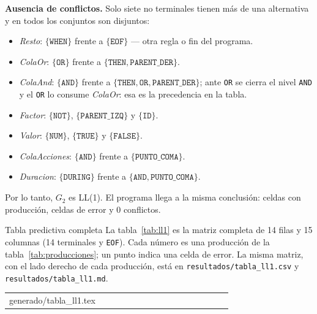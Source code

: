 \documentclass[11pt,letterpaper]{article}
\makeatletter
\renewcommand\subsection{\@startsection{subsection}{2}{\z@}{-2.6ex\@plus -1ex \@minus -.2ex}{1.0ex \@plus .2ex}%
  {\normalfont\large\bfseries}}
\newcommand{\captionof}[1]{\def\@captype{#1}\caption}
\newcommand{\filas}[1]{\@@input #1 }
\newcommand{\ruta}[1]{\nolinkurl{#1}}
\newcommand{\T}[1]{\texttt{#1}}
\newcommand{\NT}[1]{\textit{#1}}
\makeatother
\begin{document}
\textbf{Ausencia de conflictos.} Solo siete no terminales tienen más de una alternativa y en todos los conjuntos
son disjuntos:
\begin{itemize}
\item \NT{Resto}: $\{\T{WHEN}\}$ frente a $\{\T{EOF}\}$ --- otra regla o fin del programa.
\item \NT{ColaOr}: $\{\T{OR}\}$ frente a $\{\T{THEN}, \T{PARENT\_DER}\}$.
\item \NT{ColaAnd}: $\{\T{AND}\}$ frente a $\{\T{THEN}, \T{OR}, \T{PARENT\_DER}\}$; ante \T{OR} se cierra el nivel
\T{AND} y el \T{OR} lo consume \NT{ColaOr}: esa es la precedencia en la tabla.
\item \NT{Factor}: $\{\T{NOT}\}$, $\{\T{PARENT\_IZQ}\}$ y $\{\T{ID}\}$.
\item \NT{Valor}: $\{\T{NUM}\}$, $\{\T{TRUE}\}$ y $\{\T{FALSE}\}$.
\item \NT{ColaAcciones}: $\{\T{AND}\}$ frente a $\{\T{PUNTO\_COMA}\}$.
\item \NT{Duracion}: $\{\T{DURING}\}$ frente a $\{\T{AND}, \T{PUNTO\_COMA}\}$.
\end{itemize}
Por lo tanto, $G_2$ es LL(1). El programa llega a la misma conclusión: \NumCeldas{} celdas con producción,
\NumCeldasError{} celdas de error y 0 conflictos.

\subsection{Tabla predictiva completa}
La tabla~\ref{tab:ll1} es la matriz completa de 14 filas y 15 columnas (14 terminales y \T{EOF}). Cada número es
una producción de la tabla~\ref{tab:producciones}; un punto indica una celda de error. La misma matriz, con el lado
derecho de cada producción, está en \ruta{resultados/tabla_ll1.csv} y \ruta{resultados/tabla_ll1.md}.

\begin{center}
\captionof{table}{Tabla predictiva LL(1) de $G_2$ (generada por el programa; «·» = error).}\label{tab:ll1}
\small\setlength{\tabcolsep}{4.2pt}
\begin{tabular}{l*{15}{c}}
\hline
\filas{generado/tabla_ll1.tex}
\hline
\end{tabular}
\end{center}
\end{document}
